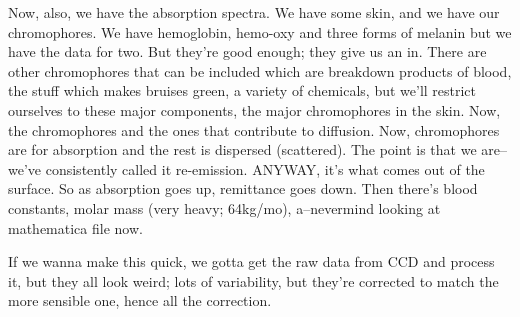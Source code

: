 Now, also, we have the absorption spectra. We have some skin, and we have our chromophores. We have hemoglobin, hemo-oxy and three forms of melanin but we have the data for two. But they're good enough; they give us an in. There are other chromophores that can be included which are breakdown products of blood, the stuff which makes bruises green, a variety of chemicals, but we'll restrict ourselves to these major components, the major chromophores in the skin. Now, the chromophores and the ones that contribute to diffusion. Now, chromophores are for absorption and the rest is dispersed (scattered). The point is that we are--we've consistently called it re-emission. ANYWAY, it's what comes out of the surface. So as absorption goes up, remittance goes down. Then there's blood constants, molar mass (very heavy; 64kg/mo), a--nevermind looking at mathematica file now.

If we wanna make this quick, we gotta get the raw data from CCD and process it, but they all look weird; lots of variability, but they're corrected to match the more sensible one, hence all the correction.












